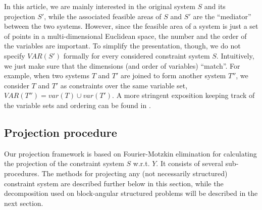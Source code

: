 In this article, we are mainly interested in the original system $S$ and its projection $S'$, while the associated feasible areas of $S$ and $S'$ are the ``mediator'' between the two systems. However, since the feasible area of a system is just a set of points in a multi-dimensional Euclidean space, the number and the order of the variables are important. To simplify the presentation, though, we do not specify $VAR(S')$ formally for every considered constraint system $S$. Intuitively, we just make sure that the dimensions (and order of variables) ``match''. For example, when two systems $T$ and $T'$ are joined to form another system $T''$, we consider $T$ and $T'$ as constraints over the same variable set, $VAR(T'')=var(T)\cup var(T')$. A more stringent exposition keeping track of the variable sets and ordering can be found in \cite{MyTechRep}.

\subsection{Projection procedure} \label{sec:methods}
Our projection framework is based on Fourier-Motzkin elimination for calculating the projection of the constraint system $S$ w.r.t. $Y$. It consists of several sub-procedures. The methods for projecting any (not necessarily structured) constraint system are described further below in this section, while the decomposition used on block-angular structured problems will be described in the next section.

